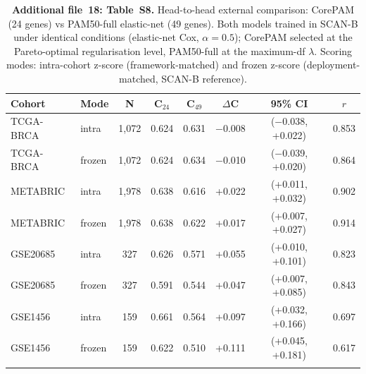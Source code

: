 \documentclass[pdflatex,sn-vancouver-num]{sn-jnl}
\begin{document}
\begin{table}[!ht]
\caption{\textbf{Additional file~18: Table~S8.} Head-to-head external comparison: CorePAM (24 genes) vs PAM50-full elastic-net (49 genes). Both models trained in SCAN-B under identical conditions (elastic-net Cox, $\alpha = 0.5$); CorePAM selected at the Pareto-optimal regularisation level, PAM50-full at the maximum-df $\lambda$. Scoring modes: intra-cohort z-score (framework-matched) and frozen z-score (deployment-matched, SCAN-B reference).}\label{tab:s8-headtohead}
\small
\begin{tabular}{@{}llcccccc@{}}
\toprule
Cohort & Mode & N & C$_{24}$ & C$_{49}$ & $\Delta$C & 95\% CI & $r$ \\
\midrule
TCGA-BRCA & intra & 1,072 & 0.624 & 0.631 & $-$0.008 & ($-$0.038, +0.022) & 0.853 \\
TCGA-BRCA & frozen & 1,072 & 0.624 & 0.634 & $-$0.010 & ($-$0.039, +0.020) & 0.864 \\
METABRIC & intra & 1,978 & 0.638 & 0.616 & +0.022 & (+0.011, +0.032) & 0.902 \\
METABRIC & frozen & 1,978 & 0.638 & 0.622 & +0.017 & (+0.007, +0.027) & 0.914 \\
GSE20685 & intra & 327 & 0.626 & 0.571 & +0.055 & (+0.010, +0.101) & 0.823 \\
GSE20685 & frozen & 327 & 0.591 & 0.544 & +0.047 & (+0.007, +0.085) & 0.843 \\
GSE1456 & intra & 159 & 0.661 & 0.564 & +0.097 & (+0.032, +0.166) & 0.697 \\
GSE1456 & frozen & 159 & 0.622 & 0.510 & +0.111 & (+0.045, +0.181) & 0.617 \\
\botrule
\end{tabular}
\end{table}


\end{document}
